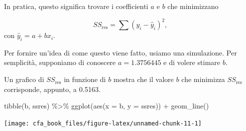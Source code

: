 \documentclass[
  11pt,
]{krantz}
\makeatletter
\newenvironment{Shaded}{\begin{snugshade}}{\end{snugshade}}
\newcommand{\AttributeTok}[1]{\textcolor[rgb]{0.61,0.61,0.61}{#1}}
\newcommand{\ConstantTok}[1]{\textcolor[rgb]{0,0,0}{#1}}
\newcommand{\ControlFlowTok}[1]{\textcolor[rgb]{0.27,0.27,0.27}{\textbf{#1}}}
\newcommand{\DecValTok}[1]{\textcolor[rgb]{0.06,0.06,0.06}{#1}}
\newcommand{\FloatTok}[1]{\textcolor[rgb]{0.06,0.06,0.06}{#1}}
\newcommand{\FunctionTok}[1]{\textcolor[rgb]{0,0,0}{#1}}
\newcommand{\NormalTok}[1]{#1}
\newcommand{\OtherTok}[1]{\textcolor[rgb]{0.37,0.37,0.37}{#1}}
\newcommand{\SpecialCharTok}[1]{\textcolor[rgb]{0,0,0}{#1}}
\newenvironment{kframe}{%
\medskip{}
\setlength{\fboxsep}{.8em}
 \def\at@end@of@kframe{}%
 \ifinner\ifhmode%
  \def\at@end@of@kframe{\end{minipage}}%
  \begin{minipage}{\columnwidth}%
 \fi\fi%
 \def\FrameCommand##1{\hskip\@totalleftmargin \hskip-\fboxsep
 \colorbox{shadecolor}{##1}\hskip-\fboxsep
     \hskip-\linewidth \hskip-\@totalleftmargin \hskip\columnwidth}%
 \MakeFramed {\advance\hsize-\width
   \@totalleftmargin\z@ \linewidth\hsize
   \@setminipage}}%
 {\par\unskip\endMakeFramed%
 \at@end@of@kframe}
\renewenvironment{Shaded}{\begin{kframe}}{\end{kframe}}
\theoremstyle{definition}
\theoremstyle{definition}
\theoremstyle{definition}
\theoremstyle{definition}
\theoremstyle{remark}
\makeatother
\begin{document}
In pratica, questo significa trovare i coefficienti \(a\) e \(b\) che minimizzano

\[
SS_{\text{res}} = \sum(y_i - \hat{y}_i)^2,
\] con \(\hat{y}_i = a + b x_i\).

Per fornire un'idea di come questo viene fatto, usiamo una simulazione. Per semplicità, supponiamo di conoscere \(a = 1.3756445\) e di volere stimare \(b\).

\begin{Shaded}
\end{Shaded}

Un grafico di \(SS_{\text{res}}\) in funzione di \(b\) mostra che il valore \(b\) che minimizza \(SS_{\text{res}}\) corrisponde, appunto, a 0.5163.

\begin{Shaded}
\begin{Highlighting}[]
\FunctionTok{tibble}\NormalTok{(b, ssres) }\SpecialCharTok{\%\textgreater{}\%}
  \FunctionTok{ggplot}\NormalTok{(}\FunctionTok{aes}\NormalTok{(}\AttributeTok{x =}\NormalTok{ b, }\AttributeTok{y =}\NormalTok{ ssres)) }\SpecialCharTok{+}
  \FunctionTok{geom\_line}\NormalTok{()}
\end{Highlighting}
\end{Shaded}

\begin{center}\texttt{[image: cfa\_book\_files/figure-latex/unnamed-chunk-11-1]} \end{center}
\end{document}
